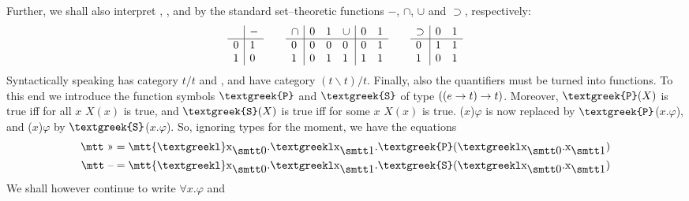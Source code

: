Further, we shall also interpret {\mtt{}}, {\mtt{}}, 
{\mtt{}} and {\mtt{}} by the standard set--theoretic 
functions $-$, $\cap$, $\cup$ and $\supset$, respectively:
\begin{equation}
\begin{array}{l|l}
  & - \\\hline
0 & 1 \\
1 & 0
\end{array}\qquad
\begin{array}{l|ll}
\cap & 0 & 1 \\\hline
0    & 0 & 0 \\
1    & 0 & 1
\end{array}\qquad \\
\begin{array}{l|ll}
\cup & 0 & 1 \\\hline
0     & 0 & 1 \\
1     & 1 & 1
\end{array}\qquad
\begin{array}{l|ll}
\supset & 0 & 1 \\\hline
0   & 1 & 1 \\
1   & 0 & 1
\end{array}
\end{equation}
\newcommand{\GPi}{\mbox{\tt\textgreek{P}}}
\newcommand{\GSi}{\mbox{\tt\textgreek{S}}}
\newcommand{\Giota}{\mbox{\tt\textgreek{i}}}
Syntactically speaking {\mtt{}} has category $t/t$ and
{\mtt{}}, {\mtt{}} and {\mtt{}} have 
category $(t\backslash t)/t$. Finally, also the quantifiers must 
be turned into functions.  To this end we introduce the function 
symbols $\GPi$ and $\GSi$ of type $((e \rightarrow t) \rightarrow t)$. Moreover, 
$\GPi(X)$ is true iff for all $x$ $X(x)$ is true, and $\GSi(X)$ 
is true iff for some $x$ $X(x)$ is true. 
{\mtt ($x$)$\varphi$} is now replaced by 
{\mtt $\GPi$(\tlambda$x$.$\varphi$)}, and 
{\mtt ($x$)$\varphi$} by 
{\mtt $\GSi$(\tlambda$x$.$\varphi$)}.
So, ignoring types for the moment, we have the equations
\begin{align} 
\mbox{\mtt \symbol{20}} & = \mbox{\mtt {\tlambda}x$_{\snull}$.%
{\tlambda}x$_{\seins}$.\GPi({\tlambda}x$_{\snull}$.x$_{\seins}$)}  \\
\mbox{\mtt \symbol{21}} & = \mbox{\mtt {\tlambda}x$_{\snull}$.%
{\tlambda}x$_{\seins}$.\GSi({\tlambda}x$_{\snull}$.x$_{\seins}$)} 
\end{align}
We shall however continue to write $\forall x.\varphi$ and 
